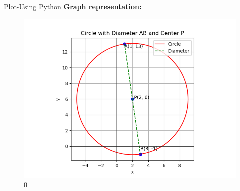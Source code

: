 \documentclass{beamer}
\begin{document}
\begin{frame}{Plot-Using  Python}
\textbf{Graph representation:}
\begin{figure}[H]
    \centering
 \includegraphics[width=0.5\linewidth]{figs/fig1.png}
    \caption{0}
    \label{fig:placeholder}
\end{figure}
\end{frame}
\end{document}
